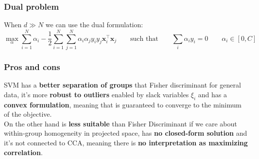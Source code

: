 \subsubsection{Dual problem}
When $d\gg N$ we can use the dual formulation:
\begin{equation}
	\max_\alpha \sum_{i=1}^{N}\alpha_i - \frac{1}{2} \sum_{i=1}^{N} \sum_{j=1}^{N} \alpha_i \alpha_jy_iy_j\mathbf{x}_i^\top \mathbf{x}_j \qquad \text{such that} \qquad \sum_{i}\alpha_i y_i = 0 \qquad \alpha_i \in [0, C]
\end{equation}
\subsubsection{Pros and cons}
SVM has a \textbf{better separation of groups} that Fisher discriminant for general data, it's more \textbf{robust to outliers} enabled by slack variables $\xi_i$ and has a \textbf{convex formulation}, meaning that is guaranteed to converge to the minimum of the objective.\\

On the other hand is \textbf{less suitable} than Fisher Discriminant if we care about within-group homogeneity in projected space, has \textbf{no closed-form solution} and it's not connected to CCA, meaning there is \textbf{no interpretation as maximizing correlation}.